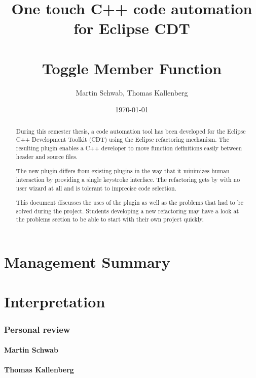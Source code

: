 \documentclass[a4paper,12pt]{scrreprt}
\title{One touch C++ code automation for Eclipse CDT \\ ~ \\ 
\normalsize{Toggle Member Function} }
\date{\today}
\author{Martin Schwab, Thomas Kallenberg}
\begin{document}
\maketitle
{}

\begin{abstract}
\thispagestyle{empty}
During this semester thesis, a code automation tool has been developed for the 
Eclipse C++ Development Toolkit (CDT) using the Eclipse refactoring mechanism. 
The resulting plugin enables a C++ developer to move function definitions easily 
between header and source files. 

The new plugin differs from existing plugins in the way that it minimizes human 
interaction by providing a single keystroke interface. The refactoring gets by 
with no user wizard at all and is tolerant to imprecise code selection. 

This document discusses the uses of the plugin as well as the problems that had 
to be solved during the project. Students developing a new refactoring may have 
a look at the problems section to be able to start with their own project 
quickly.
\end{abstract}

\chapter*{Management Summary}
\thispagestyle{empty}

\tableofcontents
\thispagestyle{empty}





\chapter{Interpretation}
\thispagestyle{fancy}

\subsection{Personal review}

\subsubsection{Martin Schwab}

\subsubsection{Thomas Kallenberg}
\end{document}
